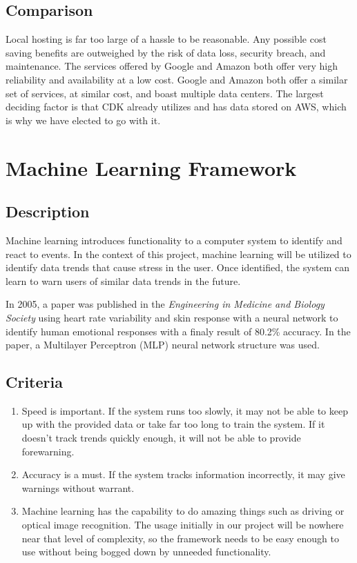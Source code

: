 \documentclass[letterpaper,10pt,onecolumn]{IEEEtran}
\begin{document}
  \subsection {Comparison}
    Local hosting is far too large of a hassle to be reasonable. Any possible cost saving benefits are outweighed by the risk of data loss, security breach, and maintenance. The services offered by Google and Amazon both offer very high reliability and availability at a low cost. Google and Amazon both offer a similar set of services, at similar cost, and boast multiple data centers. The largest deciding factor is that CDK already utilizes and has data stored on AWS, which is why we have elected to go with it.

\section{Machine Learning Framework}
  \subsection {Description}
	Machine learning introduces functionality to a computer system to identify and react to events. In the context of this project, machine learning will be utilized to identify data trends that cause stress in the user. Once identified, the system can learn to warn users of similar data trends in the future.

  In 2005, a paper was published in the \textit{Engineering in Medicine and Biology Society} using heart rate variability and skin response with a neural network to identify human emotional responses with a finaly result of 80.2\% accuracy. In the paper, a Multilayer Perceptron (MLP) neural network structure was used. \cite{nn-emotion}
  \subsection {Criteria}
    \begin{enumerate}
      \item Speed is important. If the system runs too slowly, it may not be able to keep up with the provided data or take far too long to train the system. If it doesn't track trends quickly enough, it will not be able to provide forewarning.
      \item Accuracy is a must. If the system tracks information incorrectly, it may give warnings without warrant.
	  \item Machine learning has the capability to do amazing things such as driving or optical image recognition. The usage initially in our project will be nowhere near that level of complexity, so the framework needs to be easy enough to use without being bogged down by unneeded functionality.
    \end{enumerate}
\end{document}
